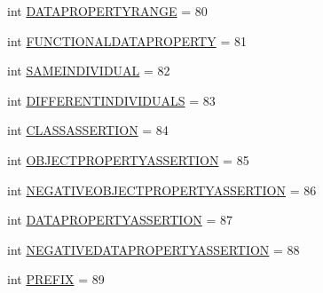 \begin{DoxyCompactItemize}
\item 
int \hyperlink{interfaceorg_1_1coode_1_1owlapi_1_1functionalparser_1_1_o_w_l_functional_syntax_parser_constants_a3094c5851f2e573e86471c603f1a30b2}{D\-A\-T\-A\-P\-R\-O\-P\-E\-R\-T\-Y\-R\-A\-N\-G\-E} = 80
\item 
int \hyperlink{interfaceorg_1_1coode_1_1owlapi_1_1functionalparser_1_1_o_w_l_functional_syntax_parser_constants_a081ee29bc8b96fe49b892c2e576308c0}{F\-U\-N\-C\-T\-I\-O\-N\-A\-L\-D\-A\-T\-A\-P\-R\-O\-P\-E\-R\-T\-Y} = 81
\item 
int \hyperlink{interfaceorg_1_1coode_1_1owlapi_1_1functionalparser_1_1_o_w_l_functional_syntax_parser_constants_a73b2ce7bdd9c53f9a397bd4d139999c0}{S\-A\-M\-E\-I\-N\-D\-I\-V\-I\-D\-U\-A\-L} = 82
\item 
int \hyperlink{interfaceorg_1_1coode_1_1owlapi_1_1functionalparser_1_1_o_w_l_functional_syntax_parser_constants_a6bbe6b5a2ec2ec5d3b07e1507ec60104}{D\-I\-F\-F\-E\-R\-E\-N\-T\-I\-N\-D\-I\-V\-I\-D\-U\-A\-L\-S} = 83
\item 
int \hyperlink{interfaceorg_1_1coode_1_1owlapi_1_1functionalparser_1_1_o_w_l_functional_syntax_parser_constants_a26b4936b0de0c1d64623636867a48a10}{C\-L\-A\-S\-S\-A\-S\-S\-E\-R\-T\-I\-O\-N} = 84
\item 
int \hyperlink{interfaceorg_1_1coode_1_1owlapi_1_1functionalparser_1_1_o_w_l_functional_syntax_parser_constants_a9de405d769eec669ce7459674e13f2cd}{O\-B\-J\-E\-C\-T\-P\-R\-O\-P\-E\-R\-T\-Y\-A\-S\-S\-E\-R\-T\-I\-O\-N} = 85
\item 
int \hyperlink{interfaceorg_1_1coode_1_1owlapi_1_1functionalparser_1_1_o_w_l_functional_syntax_parser_constants_ac450db2c101f856b5a6586346692aa84}{N\-E\-G\-A\-T\-I\-V\-E\-O\-B\-J\-E\-C\-T\-P\-R\-O\-P\-E\-R\-T\-Y\-A\-S\-S\-E\-R\-T\-I\-O\-N} = 86
\item 
int \hyperlink{interfaceorg_1_1coode_1_1owlapi_1_1functionalparser_1_1_o_w_l_functional_syntax_parser_constants_a5427e1fd874d00bb0feae3df745754fa}{D\-A\-T\-A\-P\-R\-O\-P\-E\-R\-T\-Y\-A\-S\-S\-E\-R\-T\-I\-O\-N} = 87
\item 
int \hyperlink{interfaceorg_1_1coode_1_1owlapi_1_1functionalparser_1_1_o_w_l_functional_syntax_parser_constants_ac428fe813d2105ea4ef6d20c25b14862}{N\-E\-G\-A\-T\-I\-V\-E\-D\-A\-T\-A\-P\-R\-O\-P\-E\-R\-T\-Y\-A\-S\-S\-E\-R\-T\-I\-O\-N} = 88
\item 
int \hyperlink{interfaceorg_1_1coode_1_1owlapi_1_1functionalparser_1_1_o_w_l_functional_syntax_parser_constants_acc908dc2b19fe4098297d07da886b9b1}{P\-R\-E\-F\-I\-X} = 89
\item 

\end{DoxyCompactItemize}
